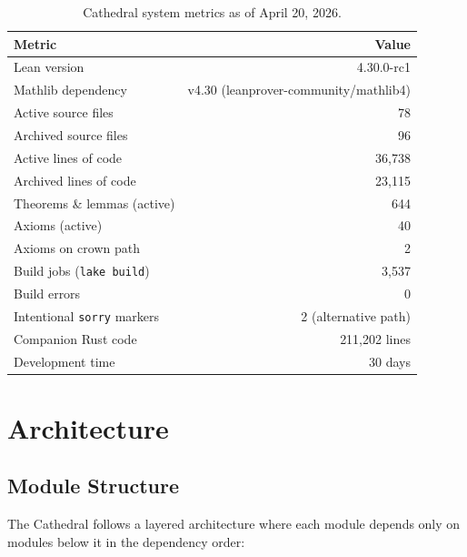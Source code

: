 \documentclass[11pt,a4paper]{article}
\begin{document}
\begin{table}[h]
\centering
\begin{tabular}{@{}lr@{}}
\toprule
\textbf{Metric} & \textbf{Value} \\
\midrule
Lean version & 4.30.0-rc1 \\
Mathlib dependency & v4.30 (leanprover-community/mathlib4) \\
Active source files & 78 \\
Archived source files & 96 \\
Active lines of code & 36,738 \\
Archived lines of code & 23,115 \\
Theorems \& lemmas (active) & 644 \\
Axioms (active) & 40 \\
Axioms on crown path & 2 \\
Build jobs (\texttt{lake build}) & 3,537 \\
Build errors & 0 \\
Intentional \texttt{sorry} markers & 2 (alternative path) \\
Companion Rust code & 211,202 lines \\
Development time & 30 days \\
\bottomrule
\end{tabular}
\caption{Cathedral system metrics as of April 20, 2026.}
\label{tab:metrics}
\end{table}

\section{Architecture}
\label{sec:architecture}

\subsection{Module Structure}

The Cathedral follows a layered architecture where each module depends
only on modules below it in the dependency order:
\end{document}
